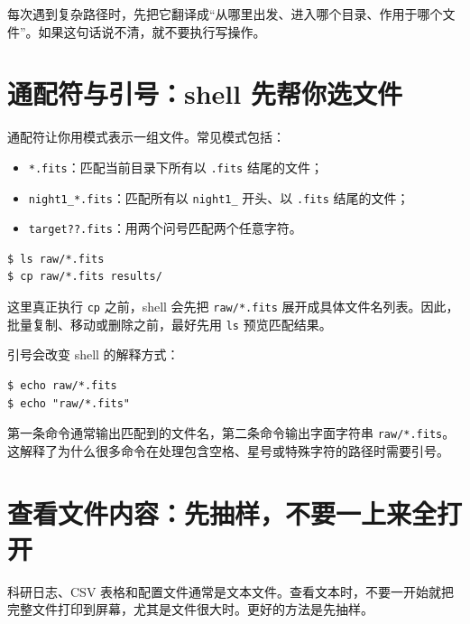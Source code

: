 \begin{protip}[把相对路径翻译成自然语言]
每次遇到复杂路径时，先把它翻译成“从哪里出发、进入哪个目录、作用于哪个文件”。如果这句话说不清，就不要执行写操作。
\end{protip}

\section{通配符与引号：shell 先帮你选文件}

通配符让你用模式表示一组文件。常见模式包括：

\begin{itemize}
    \item \texttt{*.fits}：匹配当前目录下所有以 \texttt{.fits} 结尾的文件；
    \item \texttt{night1\_*.fits}：匹配所有以 \texttt{night1\_} 开头、以 \texttt{.fits} 结尾的文件；
    \item \texttt{target??.fits}：用两个问号匹配两个任意字符。
\end{itemize}

\begin{examplebox}[先预览再批量操作]
\begin{lstlisting}[style=terminal]
$ ls raw/*.fits
$ cp raw/*.fits results/
\end{lstlisting}
\end{examplebox}

这里真正执行 \texttt{cp} 之前，shell 会先把 \texttt{raw/*.fits} 展开成具体文件名列表。因此，批量复制、移动或删除之前，最好先用 \texttt{ls} 预览匹配结果。

引号会改变 shell 的解释方式：

\begin{examplebox}[引号改变展开行为]
\begin{lstlisting}[style=terminal]
$ echo raw/*.fits
$ echo "raw/*.fits"
\end{lstlisting}
\end{examplebox}

第一条命令通常输出匹配到的文件名，第二条命令输出字面字符串 \texttt{raw/*.fits}。这解释了为什么很多命令在处理包含空格、星号或特殊字符的路径时需要引号。

\section{查看文件内容：先抽样，不要一上来全打开}

科研日志、CSV 表格和配置文件通常是文本文件。查看文本时，不要一开始就把完整文件打印到屏幕，尤其是文件很大时。更好的方法是先抽样。

